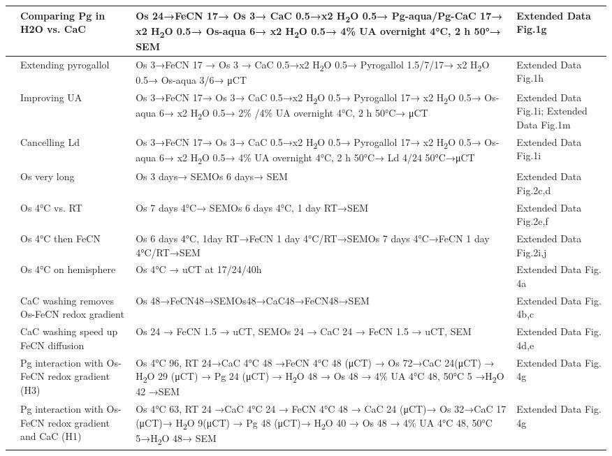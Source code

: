 \documentclass{article}
\begin{document}
\begin{longtable}{>{\raggedright\arraybackslash}p{0.6cm}>{\raggedright\arraybackslash}p{3cm}>{\raggedright\arraybackslash}p{7.3cm}>{\raggedright\arraybackslash}p{2.2cm}}
7 & Comparing Pg in H2O vs. CaC & Os 24→FeCN 17→ Os 3→ CaC 0.5→x2 H\textsubscript{2}O 0.5→ Pg-aqua/Pg-CaC 17→ x2 H\textsubscript{2}O 0.5→ Os-aqua 6→ x2 H\textsubscript{2}O 0.5→ 4\% UA overnight 4°C, 2 h 50°→ SEM & Extended Data Fig.1g \\ \midrule
8 & Extending pyrogallol & Os 3→FeCN 17 → Os 3 → CaC 0.5→x2 H\textsubscript{2}O 0.5→ Pyrogallol 1.5/7/17→ x2 H\textsubscript{2}O 0.5→ Os-aqua 3/6→ μCT & Extended Data Fig.1h \\ \midrule
9 & Improving UA & Os 3→FeCN 17→ Os 3→ CaC 0.5→x2 H\textsubscript{2}O 0.5→ Pyrogallol 17→ x2 H\textsubscript{2}O 0.5→ Os-aqua 6→ x2 H\textsubscript{2}O 0.5→ 2\% /4\% UA overnight 4°C, 2 h 50°C→ μCT & Extended Data Fig.1i; Extended Data Fig.1m \\ \midrule
10 & Cancelling Ld & Os 3→FeCN 17→ Os 3→ CaC 0.5→x2 H\textsubscript{2}O 0.5→ Pyrogallol 17→ x2 H\textsubscript{2}O 0.5→ Os-aqua 6→ x2 H\textsubscript{2}O 0.5→ 4\% UA overnight 4°C, 2 h 50°C→ Ld 4/24 50°C→μCT & Extended Data Fig.1i \\ \midrule
11 & Os very long & Os 3 days→ SEM\newline Os 6 days→ SEM & Extended Data Fig.2c,d \\ \midrule
12 & Os 4°C vs. RT & Os 7 days 4°C→ SEM\newline Os 6 days 4°C, 1 day RT→SEM & Extended Data Fig.2e,f \\ \midrule
13 & Os 4°C then FeCN & Os 6 days 4°C, 1day RT→FeCN 1 day 4°C/RT→SEM\newline Os 7 days 4°C→FeCN 1 day 4°C/RT→SEM & Extended Data Fig.2i,j \\ \midrule
14 & Os 4°C on hemisphere & Os 4°C → uCT at 17/24/40h & Extended Data Fig. 4a \\ \midrule
15 & CaC washing removes Os-FeCN redox gradient & Os 48→FeCN48→SEM\newline Os48→CaC48→FeCN48→SEM & Extended Data Fig. 4b,c \\ \midrule
16 & CaC washing speed up FeCN diffusion & Os 24 → FeCN 1.5 → uCT, SEM\newline Os 24 → CaC 24 → FeCN 1.5 → uCT, SEM & Extended Data Fig. 4d,e \\ \midrule
17 & Pg interaction with Os-FeCN redox gradient (H3) & Os 4°C 96, RT 24→CaC 4°C 48 →FeCN 4°C 48 (μCT) → Os 72→CaC 24(μCT) → H\textsubscript{2}O 29 (μCT) → Pg 24 (μCT) → H\textsubscript{2}O 48 → Os 48 → 4\% UA 4°C 48, 50°C 5 →H\textsubscript{2}O 42 →SEM & Extended Data Fig. 4g \\ \midrule
18 & Pg interaction with Os-FeCN redox gradient and CaC (H1) & Os 4°C 63, RT 24 →CaC 4°C 24 → FeCN 4°C 48 → CaC 24 (μCT)→ Os 32→CaC 17 (μCT)→ H\textsubscript{2}O 9(μCT) → Pg 48 (μCT)→ H\textsubscript{2}O 40 → Os 48 → 4\% UA 4°C 48, 50°C 5→H\textsubscript{2}O 48→ SEM & Extended Data Fig. 4g \\ \midrule

\end{longtable}
\end{document}
